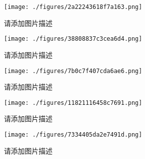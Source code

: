 
\begin{issues}
\issueDraft
\end{issues}

\begin{figure}[ht]
\centering
\texttt{[image: ./figures/2a22243618f7a163.png]}
\caption{请添加图片描述} \label{fig_PhText_1}
\end{figure}

\begin{figure}[ht]
\centering
\texttt{[image: ./figures/38808837c3cea6d4.png]}
\caption{请添加图片描述} \label{fig_PhText_2}
\end{figure}

\begin{figure}[ht]
\centering
\texttt{[image: ./figures/7b0c7f407cda6ae6.png]}
\caption{请添加图片描述} \label{fig_PhText_3}
\end{figure}

\begin{figure}[ht]
\centering
\texttt{[image: ./figures/11821116458c7691.png]}
\caption{请添加图片描述} \label{fig_PhText_4}
\end{figure}

\begin{figure}[ht]
\centering
\texttt{[image: ./figures/7334405da2e7491d.png]}
\caption{请添加图片描述} \label{fig_PhText_5}
\end{figure}